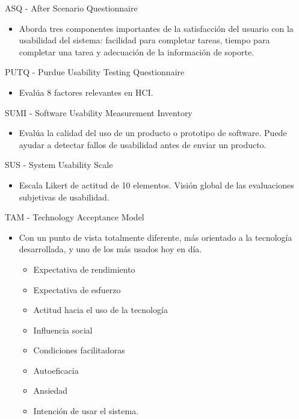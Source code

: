 \documentclass[12pt, twoside, openright]{report} %
\begin{document}
ASQ - After Scenario Questionnaire

\begin{itemize}
	\item Aborda tres componentes importantes de la satisfacción del
	      usuario con la usabilidad del sistema: facilidad para
	      completar tareas, tiempo para completar una tarea y adecuación
	      de la información de soporte.
\end{itemize}

PUTQ - Purdue Usability Testing Questionnaire

\begin{itemize}
	\item Evalúa 8 factores relevantes en HCI.
\end{itemize}

SUMI - Software Usability Measurement Inventory

\begin{itemize}
	\item Evalúa la calidad del uso de un producto o prototipo de
	      software. Puede ayudar a detectar fallos de usabilidad antes
	      de enviar un producto.
\end{itemize}

SUS - System Usability Scale

\begin{itemize}
	\item Escala Likert de actitud de 10 elementos. Visión global de las
	      evaluaciones subjetivas de usabilidad.
\end{itemize}
\pagebreak
TAM - Technology Acceptance Model

\begin{itemize}
	\item Con un punto de vista totalmente diferente, más orientado a la
	      tecnología desarrollada, y uno de los más usados hoy en día.
	      \begin{itemize}
		      \item Expectativa de rendimiento

		      \item Expectativa de esfuerzo

		      \item Actitud hacia el uso de la tecnología

		      \item Influencia social

		      \item Condiciones facilitadoras

		      \item Autoeficacia

		      \item Ansiedad

		      \item Intención de usar el sistema.
	      \end{itemize}
\end{itemize}
\end{document}
